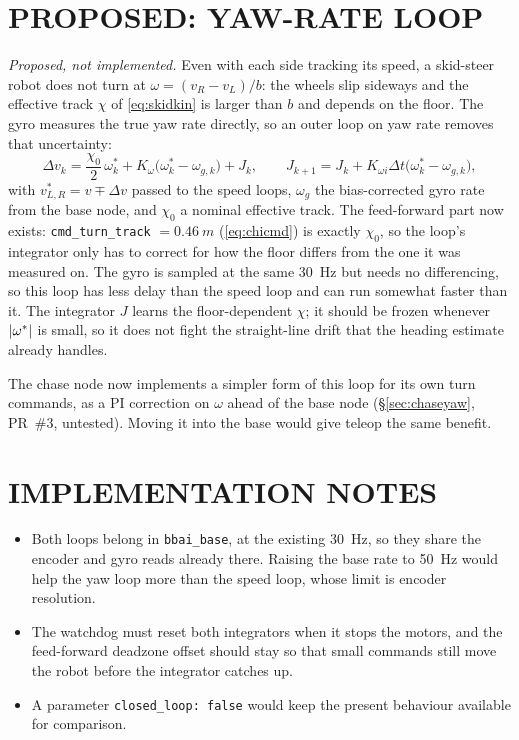 \section{PROPOSED: YAW-RATE LOOP}
\label{sec:yawloop}

\emph{Proposed, not implemented.} Even with each side tracking its speed,
a skid-steer robot does not turn at $\omega=(v_R-v_L)/b$: the wheels slip
sideways and the effective track $\chi$ of \eqref{eq:skidkin} is larger than
$b$ and depends on the floor. The gyro measures the true yaw rate directly,
so an outer loop on yaw rate removes that uncertainty:
\begin{equation}\label{eq:yawloop}
\Delta v_k = \frac{\chi_0}{2}\,\omega^\ast_k
            + K_\omega\bigl(\omega^\ast_k-\omega_{g,k}\bigr) + J_k,\qquad
J_{k+1}=J_k+K_{\omega i}\Delta t\bigl(\omega^\ast_k-\omega_{g,k}\bigr),
\end{equation}
with $v^\ast_{L,R}=v\mp\Delta v$ passed to the speed loops, $\omega_g$ the
bias-corrected gyro rate from the base node, and $\chi_0$ a nominal effective
track. The feed-forward part now exists: \texttt{cmd\_turn\_track}
$=\SI{0.46}{m}$ (\eqref{eq:chicmd}) is exactly $\chi_0$, so the loop's
integrator only has to correct for how the floor differs from the one it was
measured on. The gyro is sampled at the same \SI{30}{Hz} but needs
no differencing, so this loop has less delay than the speed loop and can run
somewhat faster than it. The integrator $J$ learns the floor-dependent
$\chi$; it should be frozen whenever $\left\lvert \omega^\ast \right\rvert$ is small, so it does
not fight the straight-line drift that the heading estimate already handles.

The chase node now implements a simpler form of this loop for its own turn
commands, as a PI correction on $\omega$ ahead of the base node
(\S\ref{sec:chaseyaw}, PR~\#3, untested). Moving it into the base would
give teleop the same benefit.

\section{IMPLEMENTATION NOTES}

\begin{itemize}
\item Both loops belong in \texttt{bbai\_base}, at the existing \SI{30}{Hz},
  so they share the encoder and gyro reads already there. Raising the base
  rate to \SI{50}{Hz} would help the yaw loop more than the speed loop, whose
  limit is encoder resolution.
\item The watchdog must reset both integrators when it stops the motors, and
  the feed-forward deadzone offset should stay so that small commands still
  move the robot before the integrator catches up.
\item A parameter \texttt{closed\_loop: false} would keep the present
  behaviour available for comparison.
\end{itemize}
